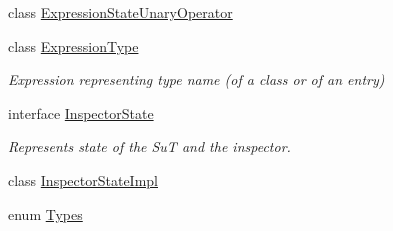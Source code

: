 \begin{DoxyCompactItemize}
\item 
class \hyperlink{classgov_1_1nasa_1_1jpf_1_1inspector_1_1server_1_1expression_1_1_expression_state_unary_operator}{Expression\+State\+Unary\+Operator}
\item 
class \hyperlink{classgov_1_1nasa_1_1jpf_1_1inspector_1_1server_1_1expression_1_1_expression_type}{Expression\+Type}
\begin{DoxyCompactList}\small\item\em Expression representing type name (of a class or of an entry) \end{DoxyCompactList}\item 
interface \hyperlink{interfacegov_1_1nasa_1_1jpf_1_1inspector_1_1server_1_1expression_1_1_inspector_state}{Inspector\+State}
\begin{DoxyCompactList}\small\item\em Represents state of the SuT and the inspector. \end{DoxyCompactList}\item 
class \hyperlink{classgov_1_1nasa_1_1jpf_1_1inspector_1_1server_1_1expression_1_1_inspector_state_impl}{Inspector\+State\+Impl}
\item 
enum \hyperlink{enumgov_1_1nasa_1_1jpf_1_1inspector_1_1server_1_1expression_1_1_types}{Types}
\end{DoxyCompactItemize}
